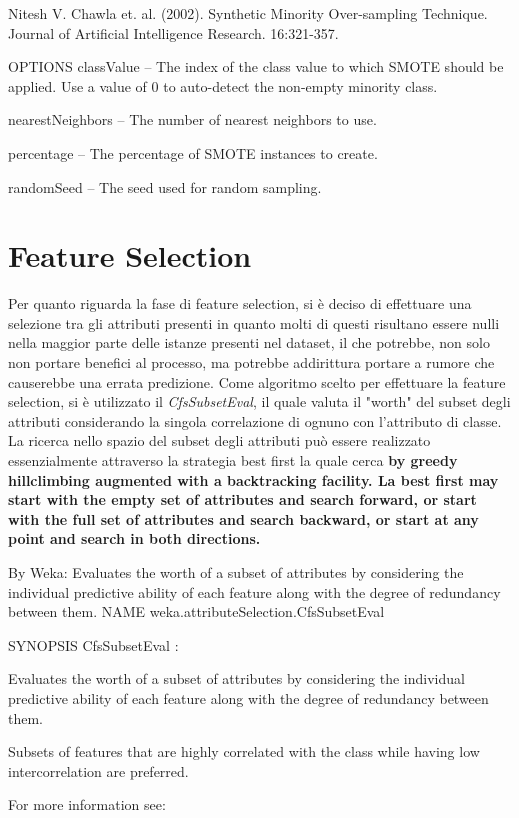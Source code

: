 Nitesh V. Chawla et. al. (2002). Synthetic Minority Over-sampling Technique. Journal of Artificial Intelligence Research. 16:321-357.

OPTIONS
classValue -- The index of the class value to which SMOTE should be applied. Use a value of 0 to auto-detect the non-empty minority class.

nearestNeighbors -- The number of nearest neighbors to use.

percentage -- The percentage of SMOTE instances to create.

randomSeed -- The seed used for random sampling.

\section{Feature Selection}

Per quanto riguarda la fase di feature selection, si è deciso di effettuare una selezione tra gli attributi presenti in quanto molti di questi risultano essere nulli nella maggior parte delle istanze presenti nel dataset, il che potrebbe, non solo non portare benefici al processo, ma potrebbe addirittura portare a rumore che causerebbe una errata predizione.
Come algoritmo scelto per effettuare la feature selection, si è utilizzato il \textit{CfsSubsetEval}, il quale valuta il "worth" del subset degli attributi considerando la singola correlazione di ognuno con l'attributo di classe. La ricerca nello spazio del subset degli attributi può essere realizzato essenzialmente attraverso la strategia best first la quale cerca \textbf{by greedy hillclimbing augmented with a backtracking facility.
La best first may start with the empty set of attributes and search forward, or start with the full set of attributes and search backward, or start at any point and search in both directions.}

By Weka:
Evaluates the worth of a subset of attributes by considering the individual predictive ability of each feature along with the degree of redundancy between them.
NAME
weka.attributeSelection.CfsSubsetEval

SYNOPSIS
CfsSubsetEval :

Evaluates the worth of a subset of attributes by considering the individual predictive ability of each feature along with the degree of redundancy between them.

Subsets of features that are highly correlated with the class while having low intercorrelation are preferred.

For more information see:

